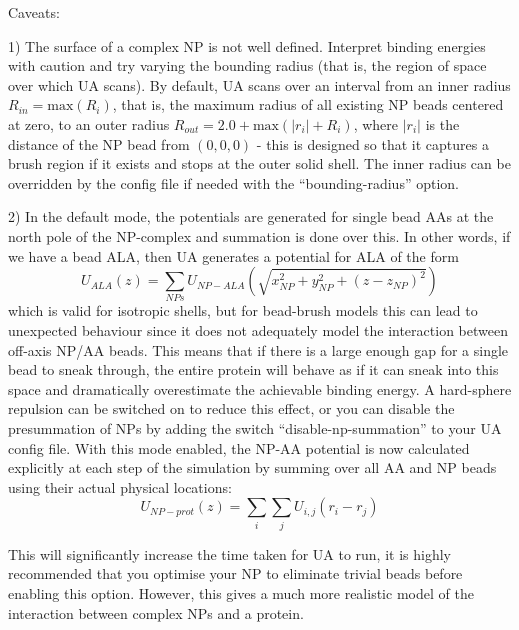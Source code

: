 \documentclass[10pt,a4paper,onecolumn]{report}
\begin{document}
Caveats:

1) The surface of a complex NP is not well defined. Interpret binding energies with caution and try varying the bounding radius (that is, the region of space over which UA scans). By default, UA scans over an interval from an inner radius $R_{in} = \mathrm{max}(R_i)$, that is, the maximum radius of all existing NP beads centered at zero, to an outer radius $R_{out} = 2.0 + \mathrm{max}( |r_i| + R_i  )$, where $|r_i|$ is the distance of the NP bead from $(0,0,0)$ - this is designed so that it captures a brush region if it exists and stops at the outer solid shell. The inner radius can be overridden by the config file if needed with the ``bounding-radius'' option. 

2) In the default mode, the potentials are generated for single bead AAs at the north pole of the NP-complex and summation is done over this. In other words, if we have a bead ALA, then UA generates a potential for ALA of the form
\begin{equation}
U_{ALA}(z) = \sum_{NPs} U_{NP-ALA}(   \sqrt{ x_{NP}^2 + y_{NP}^2 + (z - z_{NP})^2} )
\end{equation}
which is valid for isotropic shells, but for bead-brush models this can lead to unexpected behaviour since it does not adequately model the interaction between off-axis NP/AA beads. This means that if there is a large enough gap for a single bead to sneak through, the entire protein will behave as if it can sneak into this space and dramatically overestimate the achievable binding energy. A hard-sphere repulsion can be switched on to reduce this effect, or you can disable the presummation of NPs by adding the switch ``disable-np-summation'' to your UA config file. With this mode enabled, the NP-AA potential is now calculated explicitly at each step of the simulation by summing over all AA and NP beads using their actual physical locations:
\begin{equation}
U_{NP-prot}(z) = \sum_i \sum_j U_{i,j}( r_i - r_j)
\end{equation}

This will significantly increase the time taken for UA to run, it is highly recommended that you optimise your NP to eliminate trivial beads before enabling this option. However, this gives a much more realistic model of the interaction between complex NPs and a protein.
\end{document}
